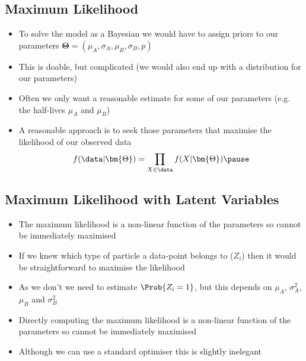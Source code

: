 \begin{slide}
\section[-1]{Maximum Likelihood}

\begin{PauseHighLight}
  \begin{itemize}
  \item To solve the model as a Bayesian we would have to assign priors
    to our parameters $\bm{\Theta} = (\mu_A, \sigma_A, \mu_B,
    \sigma_B, p)$\pause
  \item This is doable, but complicated (we would also end up with a
    distribution for our parameters)\pause
  \item Often we only want a reasonable estimate for some of our
    parameters (e.g. the half-lives $\mu_A$ and $\mu_B$)\pause
  \item A reasonable approach is to seek those parameters that maximise the
    likelihood of our observed data
    \begin{align*}
      f(\data|\bm{\Theta}) = \prod_{X\in\data} f(X|\bm{\Theta})\pause
    \end{align*}
  \end{itemize}
\end{PauseHighLight}

\end{slide}


\Outline %

\begin{slide}
\section[-1]{Maximum Likelihood with Latent Variables}

\begin{PauseHighLight}
  \begin{itemize}
  \item The maximum likelihood is a non-linear function of the
    parameters so cannot be immediately maximised\pause
  \item If we knew which type of particle a data-point belongs to
    ($Z_i$) then it would be straightforward to maximise the
    likelihood\pause
  \item As we don't we need to estimate $\Prob{Z_i=1}$, but this
    depends on $\mu_A$, $\sigma_A^2$, $\mu_B$ and $\sigma_B^2$\pause
  \item Directly computing the maximum likelihood is a non-linear function of the
    parameters so cannot be immediately maximised\pause
  \item Although we can use a standard optimiser this is slightly inelegant\pause
  \end{itemize}
\end{PauseHighLight}

\end{slide}


